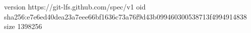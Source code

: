 version https://git-lfs.github.com/spec/v1
oid sha256:e7e6ed40dea23a7eee66bf1636c73a76f9d43b099460300538713f4994914838
size 1398256
